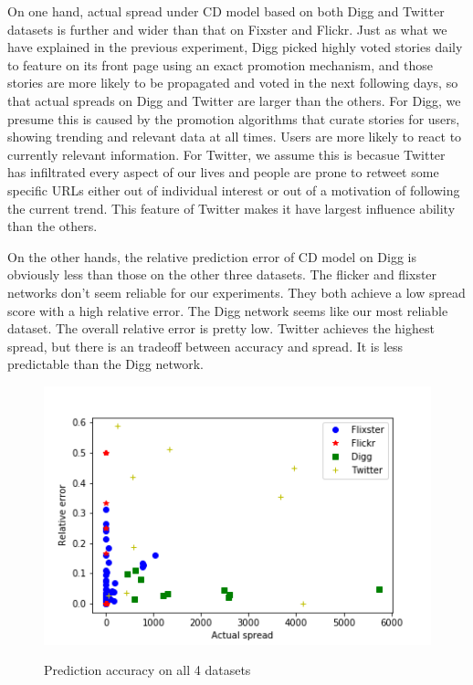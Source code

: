 \documentclass{acm_proc_article-sp}
\begin{document}
On one hand, actual spread under CD model based on both Digg and Twitter datasets is further and wider than that on Fixster and Flickr. Just as what we have explained in the previous experiment, Digg picked highly voted stories daily to feature on its front page using an exact promotion mechanism, and those stories are more likely to be propagated and voted in the next following days, so that actual spreads on Digg and Twitter are larger than the others. For Digg, we presume this is caused by the promotion algorithms that curate stories for users, showing trending and relevant data at all times. Users are more likely to react to currently relevant information. For Twitter, we assume this is becasue Twitter has infiltrated every aspect of our lives and people are prone to retweet some specific URLs either out of individual interest or out of a motivation of following the current trend. This feature of Twitter makes it have largest influence ability than the others.

On the other hands, the relative prediction error of CD model on Digg is obviously less than those on the other three datasets. The flicker and flixster networks don't seem reliable for our experiments. They both achieve a low spread score with a high relative error. The Digg network seems like our most reliable dataset. The overall relative error is pretty low. Twitter achieves the highest spread, but there is an tradeoff between accuracy and spread. It is less predictable than the Digg network.

\begin{figure}[h]
	\includegraphics[width=\linewidth]{accuracy.png}
	\centering
	\label{accuracy}
    \caption{Prediction accuracy on all 4 datasets}
\end{figure}
\end{document}
